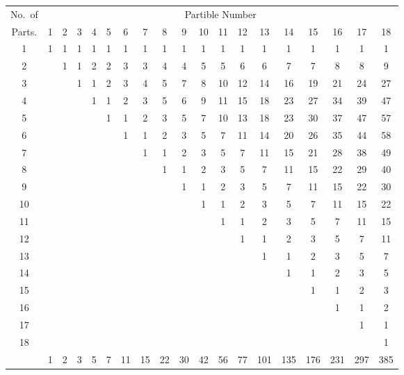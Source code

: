 \documentclass[11pt,a4paper]{article}
\begin{document}
\medskip
\begin{center}
\footnotesize
\setlength{\tabcolsep}{3pt}
\begin{tabular}{|c|cccccccccccccccccc|}
\hline
No.\ of & \multicolumn{18}{c|}{Partible Number}\\
Parts. & 1 & 2 & 3 & 4 & 5 & 6 & 7 & 8 & 9 & 10 & 11 & 12 & 13 & 14 & 15 & 16 & 17 & 18 \\
\hline
1  & 1 & 1 & 1 & 1 & 1 & 1 & 1 & 1 & 1 & 1 & 1 & 1 & 1 & 1 & 1 & 1 & 1 & 1 \\
2  &   & 1 & 1 & 2 & 2 & 3 & 3 & 4 & 4 & 5 & 5 & 6 & 6 & 7 & 7 & 8 & 8 & 9 \\
3  &   &   & 1 & 1 & 2 & 3 & 4 & 5 & 7 & 8 & 10 & 12 & 14 & 16 & 19 & 21 & 24 & 27 \\
4  &   &   &   & 1 & 1 & 2 & 3 & 5 & 6 & 9 & 11 & 15 & 18 & 23 & 27 & 34 & 39 & 47 \\
5  &   &   &   &   & 1 & 1 & 2 & 3 & 5 & 7 & 10 & 13 & 18 & 23 & 30 & 37 & 47 & 57 \\
6  &   &   &   &   &   & 1 & 1 & 2 & 3 & 5 & 7 & 11 & 14 & 20 & 26 & 35 & 44 & 58 \\
7  &   &   &   &   &   &   & 1 & 1 & 2 & 3 & 5 & 7 & 11 & 15 & 21 & 28 & 38 & 49 \\
8  &   &   &   &   &   &   &   & 1 & 1 & 2 & 3 & 5 & 7 & 11 & 15 & 22 & 29 & 40 \\
9  &   &   &   &   &   &   &   &   & 1 & 1 & 2 & 3 & 5 & 7 & 11 & 15 & 22 & 30 \\
10 &   &   &   &   &   &   &   &   &   & 1 & 1 & 2 & 3 & 5 & 7 & 11 & 15 & 22 \\
11 &   &   &   &   &   &   &   &   &   &   & 1 & 1 & 2 & 3 & 5 & 7 & 11 & 15 \\
12 &   &   &   &   &   &   &   &   &   &   &   & 1 & 1 & 2 & 3 & 5 & 7 & 11 \\
13 &   &   &   &   &   &   &   &   &   &   &   &   & 1 & 1 & 2 & 3 & 5 & 7 \\
14 &   &   &   &   &   &   &   &   &   &   &   &   &   & 1 & 1 & 2 & 3 & 5 \\
15 &   &   &   &   &   &   &   &   &   &   &   &   &   &   & 1 & 1 & 2 & 3 \\
16 &   &   &   &   &   &   &   &   &   &   &   &   &   &   &   & 1 & 1 & 2 \\
17 &   &   &   &   &   &   &   &   &   &   &   &   &   &   &   &   & 1 & 1 \\
18 &   &   &   &   &   &   &   &   &   &   &   &   &   &   &   &   &   & 1 \\
\hline
   & 1 & 2 & 3 & 5 & 7 & 11 & 15 & 22 & 30 & 42 & 56 & 77 & 101 & 135 & 176 & 231 & 297 & 385 \\
\hline
\end{tabular}
\end{center}
\end{document}

